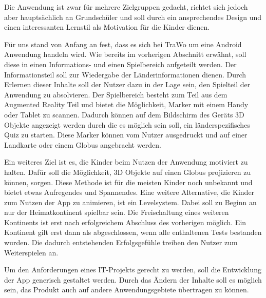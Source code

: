 Die Anwendung ist zwar für mehrere Zielgruppen gedacht, richtet sich jedoch aber hauptsächlich an Grundschüler und soll durch ein ansprechendes Design und einen interessanten Lernstil als Motivation für die Kinder dienen.

Für uns stand von Anfang an fest, dass es sich bei TraWo um eine Android Anwendung handeln wird. Wie bereits im vorherigen Abschnitt erwähnt, soll diese in einen Informations- und einen Spielbereich aufgeteilt werden. Der Informationsteil soll zur Wiedergabe der Länderinformationen dienen. Durch Erlernen dieser Inhalte soll der Nutzer dazu in der Lage sein, den Spielteil der Anwendung zu absolvieren. Der Spielbereich besteht zum Teil aus dem Augmented Reality Teil und bietet die Möglichkeit, Marker mit einem Handy oder Tablet zu scannen. Dadurch können auf dem Bildschirm des Geräts 3D Objekte angezeigt werden durch die es möglich sein soll, ein länderspezifisches Quiz zu starten. Diese Marker können vom Nutzer ausgedruckt und auf einer Landkarte oder einem Globus angebracht werden.

Ein weiteres Ziel ist es, die Kinder beim Nutzen der Anwendung motiviert zu halten. Dafür soll die Möglichkeit, 3D Objekte auf einen Globus projizieren zu können, sorgen. Diese Methode ist für die meisten Kinder noch unbekannt und bietet etwas Aufregendes und Spannendes. Eine weitere Alternative, die Kinder zum Nutzen der App zu animieren, ist ein Levelsystem. Dabei soll zu Beginn an nur der Heimatkontinent spielbar sein. Die Freischaltung eines weiteren Kontinents ist erst nach erfolgreichem Abschluss des vorherigen möglich. Ein Kontinent gilt erst dann als abgeschlossen, wenn alle enthaltenen Tests bestanden wurden. Die dadurch entstehenden Erfolgsgefühle treiben den Nutzer zum Weiterspielen an.

Um den Anforderungen eines IT-Projekts gerecht zu werden, soll die Entwicklung der App generisch gestaltet werden. Durch das Ändern der Inhalte soll es möglich sein, das Produkt auch auf andere Anwendungsgebiete übertragen zu können.

